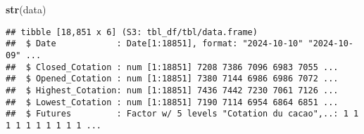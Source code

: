 \documentclass[
]{article}
\newenvironment{Shaded}{\begin{snugshade}}{\end{snugshade}}
\newcommand{\FunctionTok}[1]{\textcolor[rgb]{0.13,0.29,0.53}{\textbf{#1}}}
\newcommand{\NormalTok}[1]{#1}
\begin{document}
\begin{Shaded}
\begin{Highlighting}[]
\FunctionTok{str}\NormalTok{(data)}
\end{Highlighting}
\end{Shaded}

\begin{verbatim}
## tibble [18,851 x 6] (S3: tbl_df/tbl/data.frame)
##  $ Date            : Date[1:18851], format: "2024-10-10" "2024-10-09" ...
##  $ Closed_Cotation : num [1:18851] 7208 7386 7096 6983 7055 ...
##  $ Opened_Cotation : num [1:18851] 7380 7144 6986 6986 7072 ...
##  $ Highest_Cotation: num [1:18851] 7436 7442 7230 7061 7126 ...
##  $ Lowest_Cotation : num [1:18851] 7190 7114 6954 6864 6851 ...
##  $ Futures         : Factor w/ 5 levels "Cotation du cacao",..: 1 1 1 1 1 1 1 1 1 1 ...
\end{verbatim}
\end{document}
